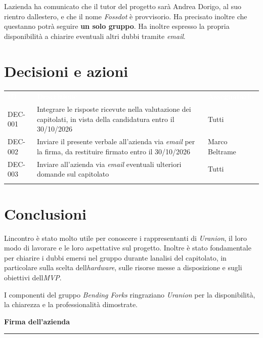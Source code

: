 \documentclass[12pt,a4paper]{article}
\begin{document}
L\textquotesingle azienda ha comunicato che il tutor del progetto sarà Andrea Dorigo, al suo rientro dall\textquotesingle estero, e che il nome \emph{Fossdot} è provvisorio. Ha precisato inoltre che quest\textquotesingle anno potrà seguire \textbf{un solo gruppo}. Ha inoltre espresso la propria disponibilità a chiarire eventuali altri dubbi tramite \emph{email}.

\hypertarget{decisioni-e-azioni}{%
\section{Decisioni e azioni}}

\begin{center}
\begin{tabularx}{\linewidth}{>{\hsize=0.511\hsize\raggedright\arraybackslash}X>{\hsize=1.675\hsize\raggedright\arraybackslash}X>{\hsize=0.814\hsize\raggedright\arraybackslash}X}
\rowcolor{bfblue}\textcolor{white}{\textbf{ID}} & \textcolor{white}{\textbf{Descrizione}} & \textcolor{white}{\textbf{Assegnatario}} \\
DEC-001 & Integrare le risposte ricevute nella valutazione dei capitolati, in vista della candidatura entro il 30/10/2026 & Tutti \\ \arrayrulecolor{bfline}\hline
DEC-002 & Inviare il presente verbale all'azienda via \emph{email} per la firma, da restituire firmato entro il 30/10/2026 & Marco Beltrame \\ \arrayrulecolor{bfline}\hline
DEC-003 & Inviare all'azienda via \emph{email} eventuali ulteriori domande sul capitolato & Tutti \\ \arrayrulecolor{bfline}\hline
\end{tabularx}
\end{center}

\hypertarget{conclusioni}{%
\section{Conclusioni}}

L\textquotesingle incontro è stato molto utile per conoscere i rappresentanti di \emph{Uranion}, il loro modo di lavorare e le loro aspettative sul progetto. Inoltre è stato fondamentale per chiarire i dubbi emersi nel gruppo durante l\textquotesingle analisi del capitolato, in particolare sulla scelta dell\textquotesingle{}\emph{hardware}, sulle risorse messe a disposizione e sugli obiettivi dell\textquotesingle{}\emph{MVP}.

I componenti del gruppo \emph{Bending Forks} ringraziano \emph{Uranion} per la disponibilità, la chiarezza e la professionalità dimostrate.

\vspace{30pt}
\begin{flushright}
\textbf{Firma dell'azienda}\\[22pt]
\rule{60mm}{0.5pt}
\end{flushright}
\end{document}
